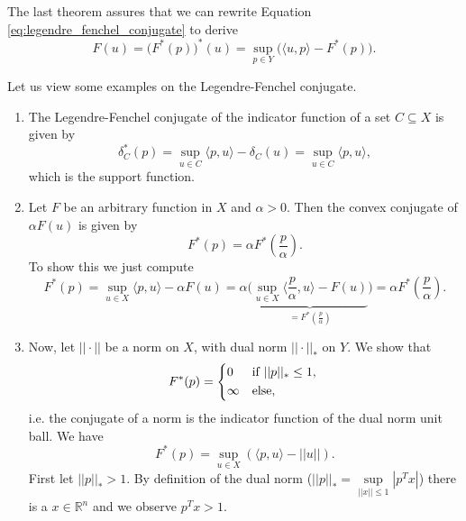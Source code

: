     The last theorem assures that we can rewrite Equation \ref{eq:legendre_fenchel_conjugate} to derive
        $$
            F(u) = \big( F^{\ast}(p) \big)^{\ast}(u) = \sup_{p \in Y} \big( \langle u, p \rangle - F^{\ast}(p) \big).
        $$
    \begin{example}
    \label{ex:legendre_fenchel_conjugate_example}

        Let us view some examples on the Legendre-Fenchel conjugate.
        \begin{enumerate}
            \item The Legendre-Fenchel conjugate of the indicator function of a set $C \subseteq X$ is given by
                $$
                    \delta^{\ast}_{C}(p) = \sup_{u \in C} \langle p, u \rangle - \delta_{C}(u) = \sup_{u \in C} \langle p, u \rangle,
                $$
            which is the support function.
            \item Let $F$ be an arbitrary function in $X$ and $\alpha > 0$. Then the convex conjugate of $\alpha F(u)$ is given by
                $$
                    F^{\ast}(p) = \alpha F^{\ast}(\frac{p}{\alpha}).
                $$
            To show this we just compute
                $$
                    F^{\ast}(p) = \sup_{u \in X} \langle p, u \rangle - \alpha F(u) = \alpha \big( \underbrace{\sup_{u \in X} \langle \frac{p}{\alpha}, u \rangle - F(u)}_{= F^{\ast}(\frac{p}{\alpha})} \big) = \alpha F^{\ast}(\frac{p}{\alpha}).
                $$
            \item Now, let $||\cdot||$ be a norm on $X$, with dual norm $||\cdot||_{\ast}$ on $Y$. We show that
                $$
                    F^{\ast}(p) =
                        \begin{dcases*}
                            0 & \textnormal{if $||p||_{\ast} \le 1$,} \\
                            \infty & \textnormal{else},
                        \end{dcases*}
                $$
            i.e. the conjugate of a norm is the indicator function of the dual norm unit ball. We have
                $$
                    F^{\ast}(p) = \sup_{u \in X} (\langle p, u \rangle - ||u||).
                $$
            First let $||p||_{\ast} > 1$. By definition of the dual norm ($||p||_{\ast} = \sup\limits_{||x|| \le 1} |p^{T}x|$) there is a $x \in \mathbb{R}^{n}$ and we observe $p^{T}x > 1$.


\end{enumerate}
\end{example}
